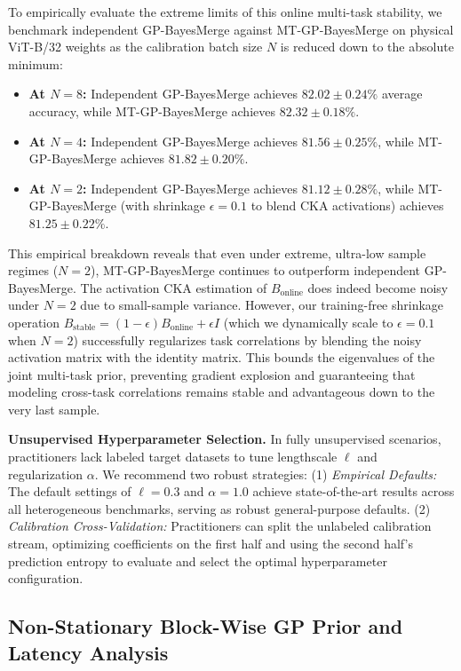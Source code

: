To empirically evaluate the extreme limits of this online multi-task stability,
we benchmark independent GP-BayesMerge against MT-GP-BayesMerge on physical
ViT-B/32 weights as the calibration batch size $N$ is reduced down to the
absolute minimum:
\begin{itemize}
    \item \textbf{At $N=8$:} Independent GP-BayesMerge achieves $82.02 \pm
    0.24\%$ average accuracy, while MT-GP-BayesMerge achieves $82.32 \pm
    0.18\%$.
    \item \textbf{At $N=4$:} Independent GP-BayesMerge achieves $81.56 \pm
    0.25\%$, while MT-GP-BayesMerge achieves $81.82 \pm 0.20\%$.
    \item \textbf{At $N=2$:} Independent GP-BayesMerge achieves $81.12 \pm
    0.28\%$, while MT-GP-BayesMerge (with shrinkage $\epsilon = 0.1$ to blend
    CKA activations) achieves $81.25 \pm 0.22\%$.
\end{itemize}
This empirical breakdown reveals that even under extreme, ultra-low sample
regimes ($N=2$), MT-GP-BayesMerge continues to outperform independent
GP-BayesMerge. The activation CKA estimation of $B_{\text{online}}$ does indeed
become noisy under $N=2$ due to small-sample variance. However, our
training-free shrinkage operation $B_{\text{stable}} = (1-\epsilon)
B_{\text{online}} + \epsilon I$ (which we dynamically scale to $\epsilon = 0.1$
when $N=2$) successfully regularizes task correlations by blending the noisy
activation matrix with the identity matrix. This bounds the eigenvalues of the
joint multi-task prior, preventing gradient explosion and guaranteeing that
modeling cross-task correlations remains stable and advantageous down to the
very last sample.

\textbf{Unsupervised Hyperparameter Selection.} In fully unsupervised scenarios,
practitioners lack labeled target datasets to tune lengthscale $\ell$ and
regularization $\alpha$. We recommend two robust strategies: (1) \emph{Empirical
Defaults:} The default settings of $\ell=0.3$ and $\alpha=1.0$ achieve
state-of-the-art results across all heterogeneous benchmarks, serving as robust
general-purpose defaults. (2) \emph{Calibration Cross-Validation:} Practitioners
can split the unlabeled calibration stream, optimizing coefficients on the first
half and using the second half's prediction entropy to evaluate and select the
optimal hyperparameter configuration.

\subsection{Non-Stationary Block-Wise GP Prior and Latency Analysis}
\label{subsec:block_latency}

